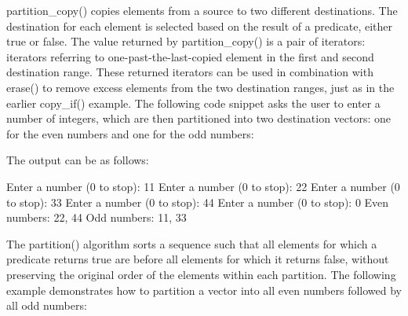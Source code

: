 
partition\_copy() copies elements from a source to two different destinations. The destination for each element is selected based on the result of a predicate, either true or false. The value returned by partition\_copy() is a pair of iterators: iterators referring to one-past-the-last-copied element in the first and second destination range. These returned iterators can be used in combination with erase() to remove excess elements from the two destination ranges, just as in the earlier copy\_if() example. The following code snippet asks the user to enter a number of integers, which are then partitioned into two destination vectors: one for the even numbers and one for the odd numbers:


The output can be as follows:

\begin{shell}
Enter a number (0 to stop): 11
Enter a number (0 to stop): 22
Enter a number (0 to stop): 33
Enter a number (0 to stop): 44
Enter a number (0 to stop): 0
Even numbers: 22, 44
Odd numbers: 11, 33
\end{shell}

The partition() algorithm sorts a sequence such that all elements for which a predicate returns true are before all elements for which it returns false, without preserving the original order of the elements within each partition. The following example demonstrates how to partition a vector into all even numbers followed by all odd numbers:


